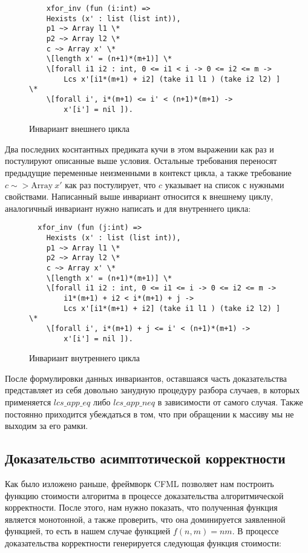 \begin{figure}[H]
  \caption{Инвариант внешнего цикла}
  \label{code:outer_cycle_inv}
  \begin{verbatim}
    xfor_inv (fun (i:int) => 
    Hexists (x' : list (list int)),
    p1 ~> Array l1 \*
    p2 ~> Array l2 \*
    c ~> Array x' \*
    \[length x' = (n+1)*(m+1)] \*
    \[forall i1 i2 : int, 0 <= i1 < i -> 0 <= i2 <= m -> 
        Lcs x'[i1*(m+1) + i2] (take i1 l1 ) (take i2 l2) ] \* 
    \[forall i', i*(m+1) <= i' < (n+1)*(m+1) ->
        x'[i'] = nil ]). 
  \end{verbatim}
\end{figure}

Два последних коснтантных предиката кучи в этом выражении как раз и постулируют описанные выше условия. Остальные требования переносят
предыдущие переменные неизменными в контекст цикла, а также требование $c \sim> \text{Array}\ x'$  как раз постулирует, что $c$ указывает на
список с нужными свойствами. Написанный выше инвариант относится к внешнему циклу, аналогичный инвариант нужно написать и для внутреннего цикла:

\begin{figure}[H]
  \caption{Инвариант внутреннего цикла}
  \label{code:inner_cycle_inv}
  \begin{verbatim}
  xfor_inv (fun (j:int) => 
    Hexists (x' : list (list int)),
    p1 ~> Array l1 \*
    p2 ~> Array l2 \*
    c ~> Array x' \*
    \[length x' = (n+1)*(m+1)] \*
    \[forall i1 i2 : int, 0 <= i1 <= i -> 0 <= i2 <= m -> 
        i1*(m+1) + i2 < i*(m+1) + j -> 
        Lcs x'[i1*(m+1) + i2] (take i1 l1 ) (take i2 l2) ] \*
    \[forall i', i*(m+1) + j <= i' < (n+1)*(m+1) ->
        x'[i'] = nil ]). 
  \end{verbatim}
\end{figure}

После формулировки данных инвариантов, оставшаяся часть доказательства представляет из себя довольно занудную процедуру
разбора случаев, в которых применяется $lcs\_app\_eq$ либо $lcs\_app\_neq$ в зависимости от самого случая. Также постоянно приходится
убеждаться в том, что при обращении к массиву мы не выходим за его рамки.
\subsection{Доказательство асимптотической корректности}
Как было изложено раньше, фреймворк CFML \cite{base_article} позволяет нам построить функцию стоимости алгоритма в процессе
доказательства алгоритмической корректности. После этого, нам нужно показать, что полученная функция является монотонной, а
также проверить, что она доминируется заявленной функцией, то есть в нашем случае функцией $f(n,m) = nm$. В процессе доказательства
корректности генерируется следующая функция стоимости:

